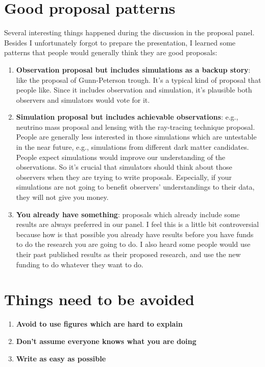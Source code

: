 \documentclass[12pt,letterpaper]{article}
\begin{document}
\section*{Good proposal patterns}

Several interesting things happened during the discussion in the proposal panel. 
Besides I unfortunately forgot to prepare the presentation, 
I learned some patterns that people would generally think they are good proposals:

\begin{enumerate}
    \item \textbf{Observation proposal but includes simulations as a backup story}: 
    like the proposal of Gunn-Peterson trough. 
    It's a typical kind of proposal that people like. 
    Since it includes observation and simulation, 
    it's plausible both observers and simulators would vote for it.
    
    \item \textbf{Simulation proposal but includes achievable observations}: 
    e.g., neutrino mass proposal and lensing with the ray-tracing technique proposal. 
    People are generally less interested in those simulations which are untestable in the near future, 
    e.g., simulations from different dark matter candidates. 
    People expect simulations would improve our understanding of the observations. 
    So it's crucial that simulators should think about those observers when they are trying to write proposals. 
    Especially, if your simulations are not going to benefit observers' understandings to their data, 
    they will not give you money.

    \item \textbf{You already have something}: 
    proposals which already include some results are always preferred in our panel. 
    I feel this is a little bit controversial because how is that possible you already have results before you have funds to do the research you are going to do. 
    I also heard some people would use their past published results as their proposed research, 
    and use the new funding to do whatever they want to do.
\end{enumerate}

\section*{Things need to be avoided}

\begin{enumerate}
    \item \textbf{Avoid to use figures which are hard to explain}
    \item \textbf{Don't assume everyone knows what you are doing}
    \item \textbf{Write as easy as possible}
\end{enumerate}
\end{document}
